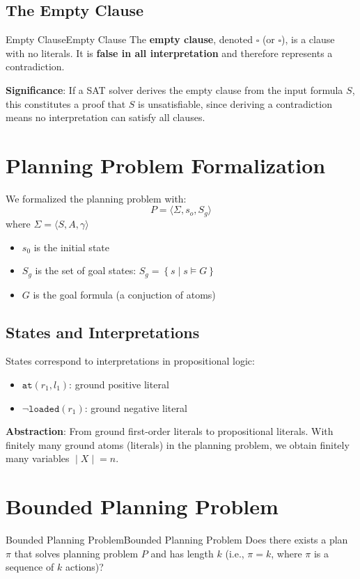 \documentclass[a4paper]{article}
\theoremstyle{definition}
\begin{document}
\subsection{The Empty Clause}
\begin{definition}{Empty Clause}{Empty Clause}
The \textbf{empty clause}, denoted \( \square \) (or \( \square \)), is a clause with no literals. It is \textbf{false in all interpretation}
and therefore represents a contradiction.
\end{definition}
\textbf{Significance}: If a SAT solver derives the empty clause from the input formula \( S \), this constitutes a proof that \( S \) is unsatisfiable, 
since deriving a contradiction means no interpretation can satisfy all clauses.
\section{Planning Problem Formalization}
We formalized the planning problem with:
\[
  P = \langle \Sigma, s_o, S_g \rangle
\]
where \( \Sigma = \langle S, A, \gamma \rangle \)
\begin{itemize}
    \item \( s_0 \) is the initial state 
    \item \( S_g \) is the set of goal states: \( S_g = \left\{ s \;|\; s \models G \right\} \)    
    \item \( G \) is the goal formula (a conjuction of atoms) 
\end{itemize}
\subsection{States and Interpretations}
States correspond to interpretations in propositional logic:
\begin{itemize}
    \item \( \texttt{at}(r_1, l_1) \): ground positive literal 
    \item \( \lnot \texttt{loaded}(r_1) \): ground negative literal
\end{itemize}
\textbf{Abstraction}: From ground first-order literals to propositional literals. With finitely many ground atoms (literals) in the planning 
problem, we obtain finitely many variables \( \;|\; X \;|\; = n \).
\section{Bounded Planning Problem}
\begin{definition}{Bounded Planning Problem}{Bounded Planning Problem}
Does there exists a plan \( \pi \) that solves planning problem \( P \) and has length \( k \) (i.e., $\pi = k$, where $\pi$ is a sequence of $k$ actions)?
\end{definition}
\end{document}

